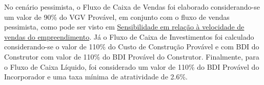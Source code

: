 \documentclass[a4paper]{article}
\begin{document}
No cenário pessimista, o Fluxo de Caixa de Vendas foi elaborado
considerando-se um valor de 90\% do VGV Provável, em conjunto com o
fluxo de vendas pessimista, como pode ser visto em
\protect\hyperlink{sensibilidade-em-relacao-a-velocidade-de-vendas-do-empreendimento}{Sensibilidade
em relação à velocidade de vendas do empreendimento}. Já o Fluxo de
Caixa de Investimentos foi calculado considerando-se o valor de 110\% do
Custo de Construção Provável e com BDI do Construtor com valor de 110\%
do BDI Provável do Construtor. Finalmente, para o Fluxo de Caixa
Líquido, foi considerado um valor de 110\% do BDI Provável do
Incorporador e uma taxa mínima de atratividade de 2.6\%.


\begin{table}


\end{table}
\end{document}
